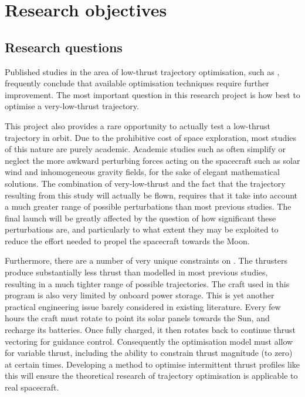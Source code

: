 \chapter{Research objectives} \label{cha:Objectives}

\section{Research questions} \label{cha:Research-questions}
Published studies in the area of low-thrust trajectory optimisation, such as \textcite{Petropoulos2007}, frequently conclude that available optimisation techniques require further improvement. The most important question in this research project is how best to optimise a very-low-thrust trajectory. 

This project also provides a rare opportunity to actually test a low-thrust trajectory in orbit. Due to the prohibitive cost of space exploration, most studies of this nature are purely academic. Academic studies such as \textcite{Betts2000} often simplify or neglect the more awkward perturbing forces acting on the spacecraft such as solar wind and inhomogeneous gravity fields, for the sake of elegant mathematical solutions. The combination of very-low-thrust and the fact that the trajectory resulting from this study will actually be flown, requires that it take into account a much greater range of possible perturbations than most previous studies. The final launch will be greatly affected by the question of how significant these perturbations are, and particularly to what extent they may be exploited to reduce the effort needed to propel the spacecraft towards the Moon.

Furthermore, there are a number of very unique constraints on \BW. The thrusters produce substantially less thrust than modelled in most previous studies, resulting in a much tighter range of possible trajectories. The craft used in this program is also very limited by onboard power storage. This is yet another practical engineering issue barely considered in existing literature. Every few hours the craft must rotate to point its solar panels towards the Sun, and recharge its batteries. Once fully charged, it then rotates back to continue thrust vectoring for guidance control. Consequently the optimisation model must allow for variable thrust, including the ability to constrain thrust magnitude (to zero) at certain times. Developing a method to optimise intermittent thrust profiles like this will ensure the theoretical research of trajectory optimisation is applicable to real spacecraft.

